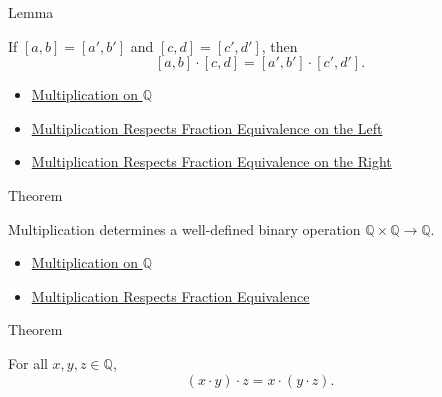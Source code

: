 \begin{lemmabox}{Lemma}
\begin{lemma}
\label{lem:multiplication-on-q-respects-equivalence}
If $[a,b]=[a',b']$ and $[c,d]=[c',d']$, then
\[
[a,b]\cdot[c,d]=[a',b']\cdot[c',d'].
\]
\end{lemma}
\end{lemmabox}

\begin{dependencies}
\begin{itemize}
  \item \hyperref[def:multiplication-on-q-classes]{Multiplication on $\mathbb{Q}$}
  \item \hyperref[lem:multiplication-on-q-respects-left-equivalence]{Multiplication Respects Fraction Equivalence on the Left}
  \item \hyperref[lem:multiplication-on-q-respects-right-equivalence]{Multiplication Respects Fraction Equivalence on the Right}
\end{itemize}
\end{dependencies}

\begin{theorembox}{Theorem}
\begin{theorem}
\label{thm:multiplication-on-q-well-defined}
Multiplication determines a well-defined binary operation
$\mathbb{Q}\times\mathbb{Q}\to\mathbb{Q}$.
\end{theorem}
\end{theorembox}

\begin{dependencies}
\begin{itemize}
  \item \hyperref[def:multiplication-on-q-classes]{Multiplication on $\mathbb{Q}$}
  \item \hyperref[lem:multiplication-on-q-respects-equivalence]{Multiplication Respects Fraction Equivalence}
\end{itemize}
\end{dependencies}

\begin{theorembox}{Theorem}
\begin{theorem}
\label{thm:multiplication-on-q-associative}
For all $x,y,z\in\mathbb{Q}$,
\[
(x\cdot y)\cdot z=x\cdot(y\cdot z).
\]
\end{theorem}
\end{theorembox}

